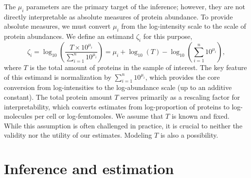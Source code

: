 The $\mu_i$ parameters are the primary target of the inference; however, they are not directly interpretable as absolute measures of protein abundance.
To provide absolute measures, we must convert $\mu_i$ from the log-intensity scale to the scale of protein abundances.
We define an estimand $\zeta_i$ for this purpose, 
%
\begin{equation}
\zeta_i = \log_{10} \left( \frac{T \times 10^{\mu_i}}{ \sum_{i=1}^{n} 10^{\mu_i}} \right) = \mu_i + \log_{10}(T) - \log_{10}\left(\sum_{i=1}^{n} 10^{\mu_i}\right), \label{proteomics:eq:abs_abund_estimand} 
\end{equation}
%
where $T$ is the total amount of proteins in the sample of interest.
The key feature of this estimand is normalization by $\sum_{i=1}^n 10^{\mu_i}$, which provides the core conversion from log-intensities to the log-abundance scale (up to an additive constant).
The total protein amount $T$ serves primarily as a rescaling factor for interpretability, which converts estimates from log-proportion of proteins to log-molecules per cell or log-femtomoles. 
We assume that $T$ is known and fixed. While this assumption is often challenged in practice, it is crucial to neither the validity nor the utility of our estimates. Modeling $T$ is also a possibility.



\section{Inference and estimation}
\label{proteomics:sec:estimation}

